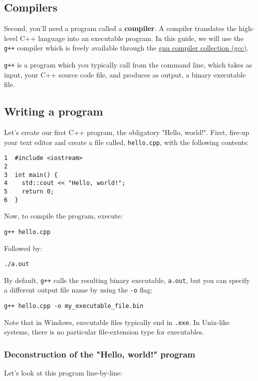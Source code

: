\documentclass[11pt]{article}
\begin{document}
\subsection{Compilers}
\label{sec-2-2}

Second, you'll need a program called a \textbf{compiler}. A compiler translates 
the high-level C++ language into an executable program. In this guide, we 
will use the \texttt{g++} compiler which is freely available through the 
\href{https://gcc.gnu.org/}{gnu compiler collection (gcc)}.

\texttt{g++} is a program which you typically call from the command line, which 
takes as input, your C++ source code file, and produces as output, a 
binary executable file.

\subsection{Writing a program}
\label{sec-2-3}

Let's create our first C++ program, the obligatory "Hello, world!". First, 
fire-up your text editor and create a file called, \texttt{hello.cpp}, with the 
following contents:

\begin{verbatim}
1  #include <iostream>
2  
3  int main() {
4    std::cout << "Hello, world!";
5    return 0;
6  }
\end{verbatim}

Now, to compile the program, execute:

\begin{verbatim}
g++ hello.cpp
\end{verbatim}

Followed by:
\begin{verbatim}
./a.out
\end{verbatim}

By default, \texttt{g++} calls the resulting binary executable, \texttt{a.out}, but
you can specify a different output file name by using the \texttt{-o} flag:

\begin{verbatim}
g++ hello.cpp -o my_executable_file.bin
\end{verbatim}

Note that in Windows, executable files typically end in \texttt{.exe}. In Unix-like
systems, there is no particular file-extension type for executables.

\subsubsection{Deconstruction of the "Hello, world!" program}
\label{sec-2-3-1}
Let's look at this program line-by-line:
\end{document}
